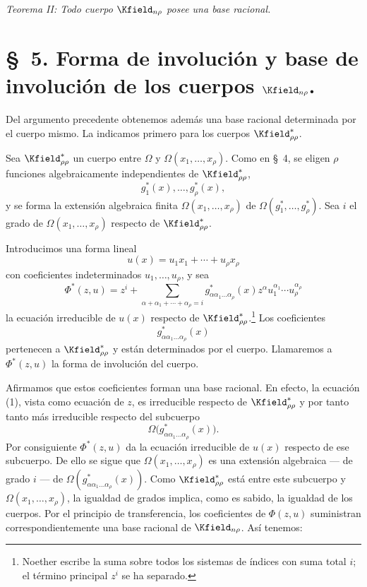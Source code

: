 \documentclass[11pt]{article}
\begin{document}
\emph{Teorema II: Todo cuerpo $\Kfield_{n\rho}$ posee una base racional.}

\section*{\S\ 5. Forma de involución y base de involución de los cuerpos $\Kfield_{n\rho}$.}

Del argumento precedente obtenemos además una base racional determinada por el cuerpo mismo. La indicamos primero para los cuerpos $\Kfield^*_{\rho\rho}$.

Sea $\Kfield^*_{\rho\rho}$ un cuerpo entre $\Omega$ y $\Omega(x_1,\ldots,x_\rho)$. Como en \S\ 4, se eligen $\rho$ funciones algebraicamente independientes de $\Kfield^*_{\rho\rho}$,
\[
  g_1^*(x),\ldots,g_\rho^*(x),
\]
y se forma la extensión algebraica finita $\Omega(x_1,\ldots,x_\rho)$ de $\Omega(g_1^*,\ldots,g_\rho^*)$. Sea $i$ el grado de $\Omega(x_1,\ldots,x_\rho)$ respecto de $\Kfield^*_{\rho\rho}$.

Introducimos una forma lineal
\[
  u(x)=u_1x_1+\cdots+u_\rho x_\rho
\]
con coeficientes indeterminados $u_1,\ldots,u_\rho$, y sea
\begin{equation}
 \Phi^*(z,u)=z^i+\sum_{\alpha+\alpha_1+\cdots+\alpha_\rho=i}
 g^*_{\alpha\alpha_1\ldots\alpha_\rho}(x)
 z^\alpha u_1^{\alpha_1}\cdots u_\rho^{\alpha_\rho}
\tag{1}
\end{equation}
la ecuación irreducible de $u(x)$ respecto de $\Kfield^*_{\rho\rho}$.\footnote{Noether escribe la suma sobre todos los sistemas de índices con suma total $i$; el término principal $z^i$ se ha separado.} Los coeficientes
\[
  g^*_{\alpha\alpha_1\ldots\alpha_\rho}(x)
\]
pertenecen a $\Kfield^*_{\rho\rho}$ y están determinados por el cuerpo. Llamaremos a $\Phi^*(z,u)$ la forma de involución del cuerpo.

Afirmamos que estos coeficientes forman una base racional. En efecto, la ecuación (1), vista como ecuación de $z$, es irreducible respecto de $\Kfield^*_{\rho\rho}$ y por tanto tanto más irreducible respecto del subcuerpo
\[
  \Omega\bigl(g^*_{\alpha\alpha_1\ldots\alpha_\rho}(x)\bigr).
\]
Por consiguiente $\Phi^*(z,u)$ da la ecuación irreducible de $u(x)$ respecto de ese subcuerpo. De ello se sigue que $\Omega(x_1,\ldots,x_\rho)$ es una extensión algebraica --- de grado $i$ --- de $\Omega(g^*_{\alpha\alpha_1\ldots\alpha_\rho}(x))$. Como $\Kfield^*_{\rho\rho}$ está entre este subcuerpo y $\Omega(x_1,\ldots,x_\rho)$, la igualdad de grados implica, como es sabido, la igualdad de los cuerpos. Por el principio de transferencia, los coeficientes de $\Phi(z,u)$ suministran correspondientemente una base racional de $\Kfield_{n\rho}$. Así tenemos:
\end{document}
